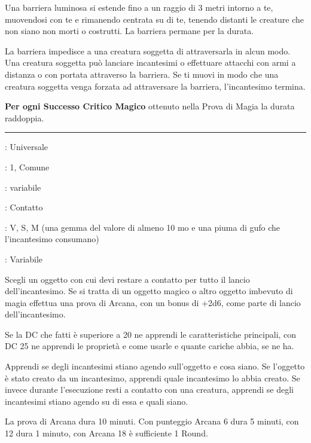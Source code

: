 \begin{multicols}{2}
Una barriera luminosa si estende fino a un raggio di 3 metri intorno a te, muovendosi con te e rimanendo centrata su di te, tenendo distanti le creature che non siano non morti o costrutti. La barriera permane per la durata.

La barriera impedisce a una creatura soggetta di attraversarla in alcun modo. Una creatura soggetta può lanciare incantesimi o effettuare attacchi con armi a distanza o con portata attraverso la barriera. Se ti muovi in modo che una creatura soggetta venga forzata ad attraversare la barriera, l'incantesimo termina.

\textbf{Per ogni Successo Critico Magico} ottenuto nella Prova di Magia la durata raddoppia.

\smallskip\noindent\rule{\linewidth}{2pt} \hypertarget{Identificare}{}\medskip{}
\noindent
\begin{description}[noitemsep, topsep=0pt, parsep=0pt, partopsep=0pt, leftmargin=0cm, labelwidth=2.8cm]
	\item[\textbf{Lista di Magia}]: Universale
	\item[\textbf{Livello}]: 1, Comune
	\item[\textbf{T. di Lancio}]: variabile
	\item[\textbf{Gittata}]: Contatto
	\item[\textbf{Componenti}]: V, S, M (una gemma del valore di almeno 10 mo e una piuma di gufo che l'incantesimo consumano)
	\item[\textbf{Durata}]: Variabile
\end{description}

Scegli un oggetto con cui devi restare a contatto per tutto il lancio dell'incantesimo. Se si tratta di un oggetto magico o altro oggetto imbevuto di magia effettua una prova di Arcana, con un bonus di +2d6, come parte di lancio dell'incantesimo.

Se la DC che fatti è superiore a 20 ne apprendi le caratteristiche principali, con DC 25 ne apprendi le proprietà e come usarle e quante cariche abbia, se ne ha.

Apprendi se degli incantesimi stiano agendo sull'oggetto e cosa siano. Se l'oggetto è stato creato da un incantesimo, apprendi quale incantesimo lo abbia creato. Se invece durante l'esecuzione resti a contatto con una creatura, apprendi se degli incantesimi stiano agendo su di essa e quali siano.

La prova di Arcana dura 10 minuti. Con punteggio Arcana 6 dura 5 minuti, con 12 dura 1 minuto, con Arcana 18 è sufficiente 1 Round.


\end{multicols}
